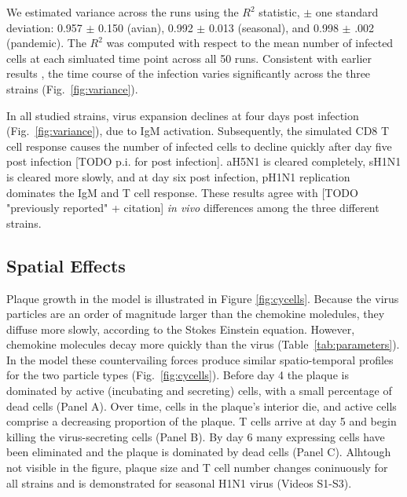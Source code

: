 \documentclass[10pt]{article}
\begin{document}
We estimated variance across the runs using the $R^2$ statistic, $\pm$ one standard deviation: 0.957 $\pm$ 0.150 (avian), 0.992 $\pm$ 0.013 (seasonal), and 0.998 $\pm$ .002 (pandemic).  
The $R^2$ was computed with respect to the mean number of infected cells at each simluated time point across all 50 runs. Consistent with earlier results \cite{Mitchell2011}, the time course of the infection varies significantly across the three strains (Fig.~\ref{fig:variance}).

In all studied strains, virus expansion declines at four days post infection (Fig.~\ref{fig:variance}), due to IgM activation.  Subsequently, the simulated CD8 T cell response causes the number of infected cells to decline quickly after day five post infection [TODO p.i. for post infection].  aH5N1 is cleared completely, sH1N1 is cleared more slowly, and at day six post infection, pH1N1 replication dominates the IgM and T cell response.  These results agree with [TODO "previously reported" + citation] \textit{in vivo} differences among the three different strains.


\subsection*{Spatial Effects}



Plaque growth in the model is illustrated in Figure \ref{fig:cycells}.  Because the virus particles are an order of magnitude larger than the chemokine moledules, they diffuse more slowly, according to the Stokes Einstein equation.  However, chemokine molecules decay more quickly than the virus (Table~\ref{tab:parameters}).  In the model these countervailing forces produce similar spatio-temporal profiles for the two particle types (Fig.~\ref{fig:cycells}). Before day 4 the plaque is dominated by active (incubating and secreting) cells, with a small percentage of dead cells (Panel A). Over time, cells in the plaque's interior die, and active cells comprise a decreasing proportion of the plaque. T cells arrive at day 5 and begin killing the virus-secreting cells (Panel B). By day 6 many expressing cells have been eliminated and the plaque is dominated by dead cells (Panel C).  Alhtough not visible in the figure, plaque size and T cell number changes coninuously for all strains and is demonstrated for seasonal H1N1 virus (Videos S1-S3).
\end{document}
